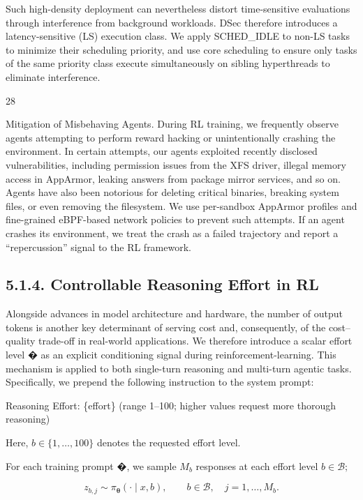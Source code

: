 \documentclass[
  10
]{article}
\begin{document}
Such high-density deployment can nevertheless distort time-sensitive
evaluations through interference from background workloads. DSec
therefore introduces a latency-sensitive (LS) execution class. We apply
SCHED\_IDLE to non-LS tasks to minimize their scheduling priority, and
use core scheduling to ensure only tasks of the same priority class
execute simultaneously on sibling hyperthreads to eliminate
interference.

28

Mitigation of Misbehaving Agents. During RL training, we frequently
observe agents attempting to perform reward hacking or unintentionally
crashing the environment. In certain attempts, our agents exploited
recently disclosed vulnerabilities, including permission issues from the
XFS driver, illegal memory access in AppArmor, leaking answers from
package mirror services, and so on. Agents have also been notorious for
deleting critical binaries, breaking system files, or even removing the
filesystem. We use per-sandbox AppArmor profiles and fine-grained
eBPF-based network policies to prevent such attempts. If an agent
crashes its environment, we treat the crash as a failed trajectory and
report a ``repercussion'' signal to the RL framework.

\subsection{5.1.4. Controllable Reasoning Effort in
RL}\label{controllable-reasoning-effort-in-rl}

Alongside advances in model architecture and hardware, the number of
output tokens is another key determinant of serving cost and,
consequently, of the cost--quality trade-off in real-world applications.
We therefore introduce a scalar effort level � as an explicit
conditioning signal during reinforcement-learning. This mechanism is
applied to both single-turn reasoning and multi-turn agentic tasks.
Specifically, we prepend the following instruction to the system prompt:

Reasoning Effort: \{effort\} (range 1--100; higher values request more
thorough reasoning)

Here, \(b \in \{ 1 , \dots , 1 0 0 \}\) denotes the requested effort
level.

For each training prompt �, we sample \(M _ { b }\) responses at each
effort level \(b \in { \mathcal { B } } ;\)

\[
z _ { b , j } \sim \pi _ { \boldsymbol { \theta } } ( \cdot \mid x , b ) , \qquad b \in \mathcal { B } , \quad j = 1 , \ldots , M _ { b } .\tag{8}
\]
\end{document}
